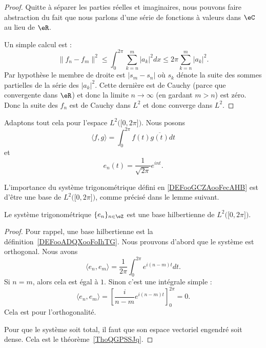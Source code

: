 \begin{proof}
    Quitte à séparer les parties réelles et imaginaires, nous pouvons faire abstraction du fait que nous parlons d'une série de fonctions à valeurs dans \( \eC\) au lieu de \( \eR\).

    Un simple calcul est :
    \begin{equation}    \label{EqHVdJxZT}
        \| f_n-f_m \|^2\leq\int_0^{2\pi}\sum_{k=n}^m| a_k |^2dx\leq 2\pi\sum_{k=n}^m| a_k |^2.
    \end{equation}
    Par hypothèse le membre de droite est \( | s_m-s_n |\) où \( s_k\) dénote la suite des sommes partielles de la série des \( | a_k |^2\). Cette dernière est de Cauchy (parce que convergente dans \( \eR\)) et donc la limite \( n\to\infty\) (en gardant \( m>n\)) est zéro. Donc la suite des \( f_n\) est de Cauchy dans \( L^2\) et donc converge dans \( L^2\).
\end{proof}

Adaptons tout cela pour l'espace \( L^2\big( \mathopen[ 0 , 2\pi \mathclose] \big)\). Nous posons
\begin{equation}        \label{EQooBFKDooMkCZOt}
    \langle f, g\rangle =\int_0^{2\pi}f(t)\overline{ g(t) }dt
\end{equation}
et
\begin{equation}        \label{EQooKMYOooLZCNap}
    e_n(t)=\frac{1}{ \sqrt{ 2\pi } } e^{int}.
\end{equation}


L'importance du système trigonométrique défini en \ref{DEFooGCZAooFecAHB} est d'être une base de \( L^2\big( \mathopen[ 0 , 2\pi \mathclose] \big)\), comme précisé dans le lemme suivant.
\begin{lemma}       \label{LEMooBJDQooLVPczR}
    Le système trigonométrique \( \{ e_n \}_{n\in \eZ}\) est une base hilbertienne de \( L^2\big( \mathopen[ 0 , 2\pi \mathclose] \big)\).
\end{lemma}

\begin{proof}
    Pour rappel, une base hilbertienne est la définition~\ref{DEFooADQXooFoIhTG}. Nous prouvons d'abord que le système est orthogonal. Nous avons
    \begin{equation}
        \langle e_n, e_m\rangle =\frac{1}{ 2\pi }\int_0^{2\pi} e^{i(n-m)t}dt.
    \end{equation}
    Si \( n=m\), alors cela est égal à \( 1\). Sinon c'est une intégrale simple :
    \begin{equation}
        \langle e_n, e_m\rangle =\left[ \frac{ i }{ n-m } e^{i(n-m)t} \right]_0^{2\pi}=0.
    \end{equation}
    Cela est pour l'orthogonalité.

    Pour que le système soit total, il faut que son espace vectoriel engendré soit dense. Cela est le théorème~\ref{ThoQGPSSJq}.
\end{proof}

